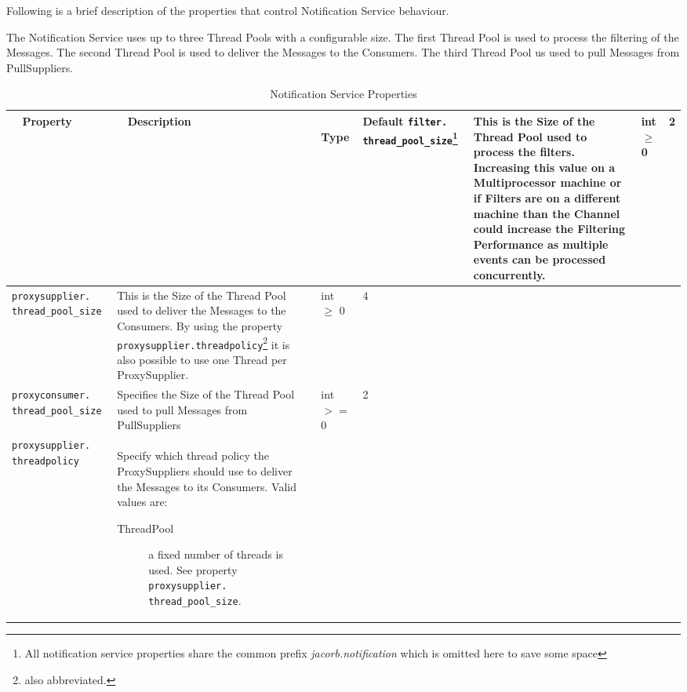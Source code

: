 Following is a brief description of the properties
that control Notification Service behaviour.

The Notification Service uses up to three Thread Pools with a configurable
size. The first Thread Pool is used to process the filtering of the
Messages. The second Thread Pool is used to deliver the Messages to the
Consumers. The third Thread Pool us used to pull Messages from PullSuppliers.

\begin{small}
  \begin{longtable}{|p{5cm}|p{7.5cm}|p{1.5cm}|p{1.5cm}|}
    \caption{Notification Service Properties}\\
    \hline
    ~ \hfill \textbf {Property} \hfill ~ & ~ \hfill \textbf {Description}
    \hfill ~ & ~ \hfill \textbf {Type} \hfill ~ & \hfill \textbf{Default} \endhead
    \hline
    \verb"filter."
    \verb"thread_pool_size"\footnote{All notification service
    properties share the common prefix \emph{jacorb.notification} which
    is omitted here to save some space} &

    This is the Size of the Thread Pool used to process the filters.
    Increasing this value on a Multiprocessor machine or if Filters are on
    a different machine than the Channel could increase the Filtering
    Performance as multiple events can be processed concurrently. &

    int $\geq$ 0 &

    2 \\
    \hline

    \verb"proxysupplier."
    \verb"thread_pool_size" &

    This is the Size of the Thread Pool used to deliver the Messages to
    the Consumers. By using the property
    \texttt{proxysupplier.threadpolicy}\footnote{also abbreviated.}
    it is also possible to use one Thread per ProxySupplier. &

    int $\geq$ 0 &
    4 \\ \hline

    \verb"proxyconsumer."
    \verb"thread_pool_size" &

    Specifies the Size of the Thread Pool used to pull Messages from
    PullSuppliers &

    int $>=$ 0 &

    2 \\ \hline

    \verb"proxysupplier."
    \verb"threadpolicy" &

    Specify which thread policy the ProxySuppliers should use to deliver
    the Messages to its Consumers. Valid values are:
    \begin{description}
    \item[ThreadPool] a fixed number of threads is used. See property
      \verb"proxysupplier."
      \verb"thread_pool_size".


\end{description}
\end{longtable}
\end{small}
